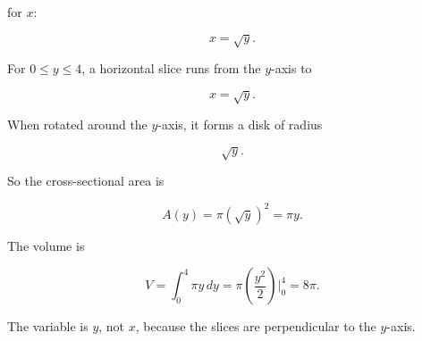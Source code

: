 for \(x\):

\[
x=\sqrt{y}.
\]

For \(0\le y\le4\), a horizontal slice runs from the \(y\)-axis to

\[
x=\sqrt{y}.
\]

When rotated around the \(y\)-axis, it forms a disk of radius

\[
\sqrt{y}.
\]

So the cross-sectional area is

\[
A(y)=\pi(\sqrt{y})^2=\pi y.
\]

The volume is

\[
V=\int_0^4 \pi y\,dy
=
\pi\left(\frac{y^2}{2}\right)\Big|_0^4
=
\boxed{8\pi}.
\]

The variable is \(y\), not \(x\), because the slices are perpendicular to the \(y\)-axis.

